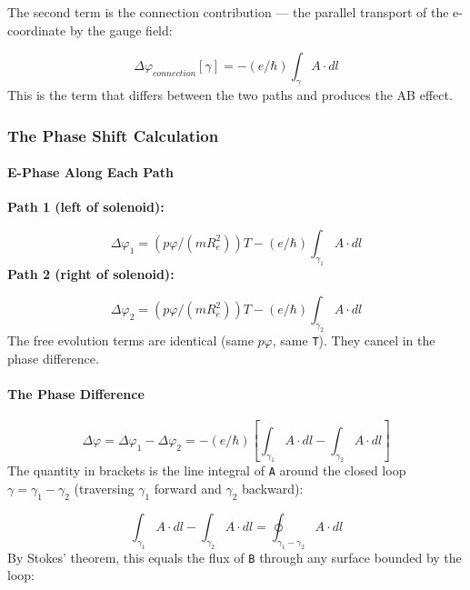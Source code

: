 \documentclass[aps,prd,preprint,superscriptaddress,longbibliography,floatfix]{revtex4-2}
\theoremstyle{remark}
\begin{document}
The second term is the connection contribution --- the parallel transport of the e-coordinate by the gauge field:


\begin{equation}
    \Delta\varphi_{connection}[\gamma] = -(e/\hbar) \int_\gamma A \cdot dl
\end{equation}
This is the term that differs between the two paths and produces the AB effect.


\subsubsection{The Phase Shift Calculation}


\paragraph{E-Phase Along Each Path}

\textbf{Path 1 (left of solenoid):}


\begin{equation}
    \Delta\varphi_{1} = (p\varphi/(mR_e^{2}))T - (e/\hbar) \int_{\gamma_{1}} A \cdot dl
\end{equation}
\textbf{Path 2 (right of solenoid):}


\begin{equation}
    \Delta\varphi_{2} = (p\varphi/(mR_e^{2}))T - (e/\hbar) \int_{\gamma_{2}} A \cdot dl
\end{equation}
The free evolution terms are identical (same $p\varphi$, same \texttt{T}). They cancel in the phase difference.


\paragraph{The Phase Difference}


\begin{equation}
    \Delta\varphi = \Delta\varphi_{1} - \Delta\varphi_{2} = -(e/\hbar)[\int_{\gamma_{1}} A \cdot dl - \int_{\gamma_{2}} A \cdot dl]
\end{equation}
The quantity in brackets is the line integral of \texttt{A} around the closed loop $\gamma = \gamma_{1} - \gamma_{2}$ (traversing $\gamma_{1}$ forward and $\gamma_{2}$ backward):


\begin{equation}
    \int_{\gamma_{1}} A \cdot dl - \int_{\gamma_{2}} A \cdot dl = \oint_{\gamma_{1} - \gamma_{2}} A \cdot dl
\end{equation}
By Stokes' theorem, this equals the flux of \texttt{B} through any surface bounded by the loop:
\end{document}
